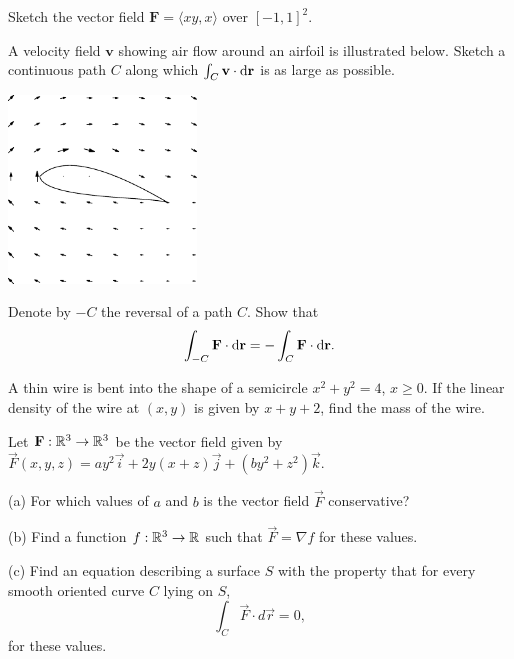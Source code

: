 \documentclass{watsonbook}
\begin{document}

\begin{aexercise}
  Sketch the vector field $\mathbf{F} =\langle xy, x\rangle$ over
  $[-1,1]^2$. 
\end{aexercise}

\begin{aexercise}
  A velocity field $\mathbf{v}$ showing air flow around an airfoil is
  illustrated below. Sketch a continuous path $C$ along which
  $\int_C \mathbf{v} \cdot \mathrm{d}\mathbf{r}$ is as large as possible. 
  \begin{center}
    \includegraphics[width=5cm]{exercisefigures/airfoil.pdf}
  \end{center}
\end{aexercise}

\begin{aexercise}
  Denote by $-C$ the reversal of a path $C$. Show that 
  \[
    \int_{-C} \mathbf{F} \cdot \mathrm{d}\mathbf{r} = -\int_{C}\mathbf{F}
    \cdot \mathrm{d}\mathbf{r}. 
  \]
\end{aexercise}


\begin{aexercise}
  A thin wire is bent into the shape of a semicircle $x^2 + y^2 = 4$,
  $x \geq 0$. If the linear density of the wire at $(x,y)$ is given by
  $x+y+2$, find the mass of the wire. 
\end{aexercise}

\begin{aexercise}
  Let $\mathbf{F}:\mathbb{R}^3 \to \mathbb{R}^3$ be the vector field given by
  $\vec{F}(x,y,z)=ay^2\vec{i}+2y(x+z)\vec{j}+(by^2 +z^2)\vec{k}$.

  (a) For which values of $a$ and $b$ is the vector field $\vec{F}$
  conservative?

  (b) Find a function $f:\mathbb{R}^3 \to \mathbb{R}$ such that $\vec{F} = \nabla f$
  for these values.

  (c) Find an equation describing a surface $S$ with the property that
  for every smooth oriented curve $C$ lying on $S$,
  \[
    \int_C \vec{F}\cdot d\vec{r} = 0,
  \]
  for these values.
\end{aexercise}
\end{document}
